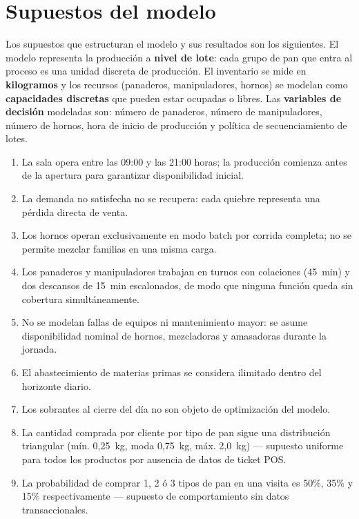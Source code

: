 \documentclass[12pt]{article}
\begin{document}
\newpage
\section{Supuestos del modelo}

Los supuestos que estructuran el modelo y sus resultados son los siguientes. El modelo representa la producción a \textbf{nivel de lote}: cada grupo de pan que entra al proceso es una unidad discreta de producción. El inventario se mide en \textbf{kilogramos} y los recursos (panaderos, manipuladores, hornos) se modelan como \textbf{capacidades discretas} que pueden estar ocupadas o libres. Las \textbf{variables de decisión} modeladas son: número de panaderos, número de manipuladores, número de hornos, hora de inicio de producción y política de secuenciamiento de lotes.

\begin{enumerate}
  \item La sala opera entre las 09:00 y las 21:00 horas; la producción comienza antes de la apertura para garantizar disponibilidad inicial.
  \item La demanda no satisfecha no se recupera: cada quiebre representa una pérdida directa de venta.
  \item Los hornos operan exclusivamente en modo batch por corrida completa; no se permite mezclar familias en una misma carga.
  \item Los panaderos y manipuladores trabajan en turnos con colaciones (45~min) y dos descansos de 15~min escalonados, de modo que ninguna función queda sin cobertura simultáneamente.
  \item No se modelan fallas de equipos ni mantenimiento mayor: se asume disponibilidad nominal de hornos, mezcladoras y amasadoras durante la jornada.
  \item El abastecimiento de materias primas se considera ilimitado dentro del horizonte diario.
  \item Los sobrantes al cierre del día no son objeto de optimización del modelo.
  \item La cantidad comprada por cliente por tipo de pan sigue una distribución triangular (mín. 0,25~kg, moda 0,75~kg, máx. 2,0~kg) --- supuesto uniforme para todos los productos por ausencia de datos de ticket POS.
  \item La probabilidad de comprar 1, 2 ó 3 tipos de pan en una visita es 50\%, 35\% y 15\% respectivamente --- supuesto de comportamiento sin datos transaccionales.
\end{enumerate}
\end{document}
